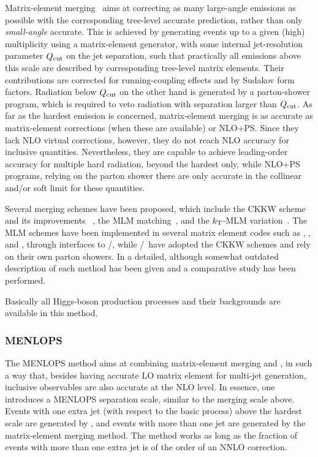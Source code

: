 Matrix-element merging~\cite{Catani:2001cc} aims at correcting as many large-angle 
emissions as possible with the corresponding tree-level accurate
prediction, rather than only {\em small-angle} accurate.
This is achieved by generating events up to a given 
(high) multiplicity using a matrix-element generator, with some internal
jet-resolution parameter $Q_{\rm cut}$ on the jet separation, such that 
practically all emissions above this scale are described by corresponding 
tree-level matrix elements.  Their contributions are corrected for running-coupling 
effects and by Sudakov form factors.  Radiation below $Q_{\rm cut}$ 
on the other hand is generated by a parton-shower program, which is 
required to veto radiation with separation larger than $Q_{\rm cut}$.  As 
far as the hardest emission is concerned, matrix-element merging is as 
accurate as matrix-element corrections (when these are available) or NLO+PS. 
Since they lack NLO virtual corrections, however, they do not reach NLO 
accuracy for inclusive quantities.
Nevertheless, they are capable to achieve leading-order accuracy for multiple
hard radiation, beyond the hardest only, while NLO+PS programs, relying on
the parton shower there are only accurate in the collinear and/or soft limit 
for these quantities.

Several merging schemes have been proposed, which include the CKKW 
scheme~\cite{Catani:2001cc,Krauss:2002up,Lonnblad:2001iq}
 and its improvements
~\cite{Hoeche:2009rj,Hamilton:2009ne},
the MLM matching~\cite{Mangano:2001xp},
and the $k_{\mathrm{T}}$-MLM variation~\cite{Alwall:2008qv}. 
The MLM schemes have been implemented in several matrix element codes such
as \alpgen, \helac, and \MGME, through interfaces to \pythia/\herwig,
while \sherpa/\herwigpp\ have adopted the CKKW schemes and rely on their 
own parton showers. In  a detailed, although 
somewhat outdated description of each method has been given and a comparative 
study has been performed.

Basically all Higgs-boson production processes and their backgrounds are 
available in this method.

\subsubsection{MENLOPS}
\label{menlops}

The MENLOPS method \cite{Hamilton:2010wh,Hoeche:2010kg} aims at combining 
matrix-element merging and \POWHEG, in such a way that, besides having 
accurate LO matrix element for multi-jet generation, inclusive observables 
are also accurate at the NLO level. In essence, one introduces a MENLOPS 
separation scale, similar to the merging scale above. Events
with one extra jet (with respect to the basic process) above the hardest
scale are generated by \POWHEG, and events with more than one jet are
generated by the matrix-element merging method. The method works as
long as the fraction of events with more than one extra jet is of the
order of an NNLO correction. 

